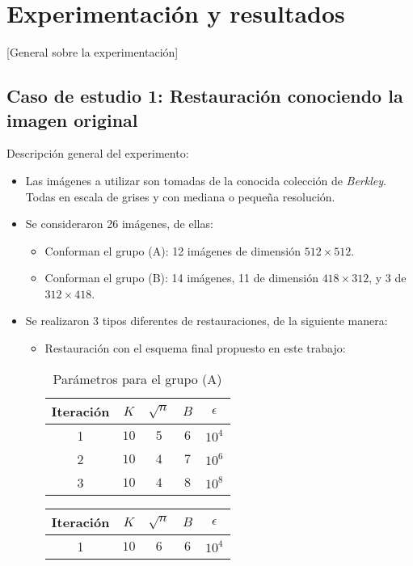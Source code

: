 \chapter{Experimentaci\'on y resultados}\label{chapter:results}
[General sobre la experimentaci\'on]

\section{Caso de estudio 1: Restauraci\'on conociendo la imagen original}

Descripci\'on general del experimento:
\begin{itemize}
	\item Las im\'agenes a utilizar son tomadas de la conocida colecci\'on de \textit{Berkley}. Todas en escala de grises y con mediana o pequeña resoluci\'on.
	\item Se consideraron 26 im\'agenes, de ellas:
	\begin{itemize}
		\item Conforman el grupo (A): 12 im\'agenes de dimensi\'on $512 \times 512$.
		\item Conforman el grupo (B): 14 im\'agenes, 11 de dimensi\'on $418 \times 312$, y 3 de $312 \times 418$.
	\end{itemize}
	\item Se realizaron 3 tipos diferentes de restauraciones, de la siguiente manera:
	\begin{itemize}
		\item Restauraci\'on con el esquema final propuesto en este trabajo:
		\begin{table}[H]
			\centering
			\begin{tabular}{|c|cccc|}
				\hline
				Iteraci\'on & $K$ & $\sqrt{n}$ & $B$ & $\epsilon$ \\\hline
				1 & $10$ & $5$ & $6$ & $10^4$\\
				2 & $10$ & $4$ & $7$ & $10^6$\\
				3 & $10$ & $4$ & $8$ & $10^8$\\\hline
			\end{tabular}
			\caption{Par\'ametros para el grupo (A)}
		\end{table}
		\begin{table}[H]
			\centering
			\begin{tabular}{|c|cccc|}
				\hline
				Iteraci\'on & $K$ & $\sqrt{n}$ & $B$ & $\epsilon$ \\\hline
				1 & $10$ & $6$ & $6$ & $10^4$\\

\end{tabular}
\end{table}
\end{itemize}
\end{itemize}
